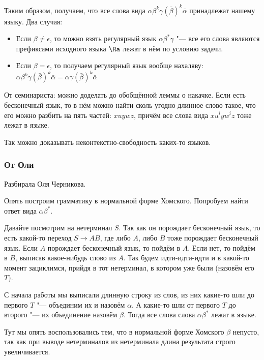 		Таким образом, получаем, что все слова вида $\alpha \beta^k \gamma \left(\bar\beta\right)^k \bar\alpha$ принадлежат нашему языку.
		Два случая:
		\begin{itemize}
			\item Если $\beta \neq \epsilon$, то можно взять регулярный язык $\alpha\beta^*\gamma$ "--- все его слова являются префиксами исходного языка $\Ra$ лежат в нём по условию задачи.
			\item Если $\beta = \epsilon$, то получаем регулярный язык вообще нахаляву: $\alpha \beta^k \gamma \left(\bar\beta\right)^k \bar\alpha = \alpha \gamma \left(\bar\beta\right)^k \bar \alpha$
		\end{itemize}

		\begin{Rem}
			От семинариста: можно доделать до обобщённой леммы о накачке.
			Если есть бесконечный язык, то в нём можно найти сколь угодно длинное слово такое,
			что его можно разбить на пять частей: $xuywz$, причём все слова вида
			$xu^iyw^iz$ тоже лежат в языке.

			Так можно доказывать неконтекстно-свободность каких-то языков.
		\end{Rem}

	\subsubsection{От Оли}
		Разбирала Оля Черникова.

		Опять построим грамматику в нормальной форме Хомского.
		Попробуем найти ответ вида $\alpha\beta^*$.

		Давайте посмотрим на нетерминал $S$.
		Так как он порождает бесконечный язык, то есть какой-то переход $S \to AB$,
		где либо $A$, либо $B$ тоже порождает бесконечный язык.
		Если $A$ порождает бесконечный язык, то пойдём в $A$.
		Если нет, то пойдём в $B$, выписав какое-нибудь слово из $A$.
		Так будем идти-идти-идти и в какой-то момент зациклимся, прийдя в тот нетерминал, в котором уже были (назовём его $T$).

		С начала работы мы выписали длинную строку из слов, из них какие-то шли до первого $T$ "--- объединим их и назовём $\alpha$.
		А какие-то шли от первого $T$ до второго "--- их объединение назовём $\beta$.
		Тогда все слова слова $\alpha\beta^*$ лежат в языке.
		\begin{Rem}
			Тут мы опять воспользовались тем, что в нормальной форме Хомского $\beta$ непусто,
			так как при выводе нетерминалов из нетерминала длина результата строго увеличивается.
		\end{Rem}

